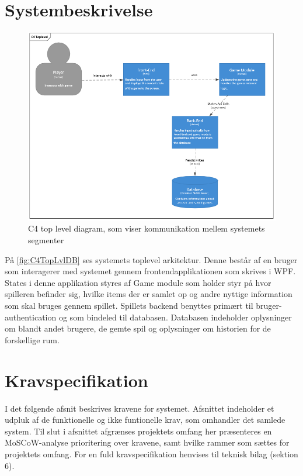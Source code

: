 \section{Systembeskrivelse}

\begin{figure}[H]
\centering
\includegraphics[width = \textwidth]{02-Body/Images/C4TopLvlDB}
\caption{C4 top level diagram, som viser kommunikation mellem systemets segmenter}
\label{fig:C4TopLvlDB}
\end{figure}

På \autoref{fig:C4TopLvlDB} ses systemets toplevel arkitektur.
Denne består af en bruger som interagerer med systemet gennem frontendapplikationen som skrives i WPF. States i denne applikation styres af Game module som holder styr på hvor spilleren befinder sig, hvilke items der er samlet op og andre nyttige information som skal bruges gennem spillet.
Spillets backend benyttes primært til bruger-authentication og som bindeled til databasen.
Databasen indeholder oplysninger om blandt andet brugere, de gemte spil og oplysninger om historien for de forskellige rum.

\newpage


\section{Kravspecifikation}
\label{sec:kravspec}

I det følgende afsnit beskrives kravene for systemet. Afsnittet indeholder et udpluk af de funktionelle og ikke funtionelle krav, som omhandler det samlede system. Til slut i afsnittet afgrænses projektets omfang her præsenteres en MoSCoW-analyse prioritering over kravene, samt hvilke rammer som sættes for projektets omfang. For en fuld kravspecifikation henvises til teknisk bilag (sektion 6).\\  


